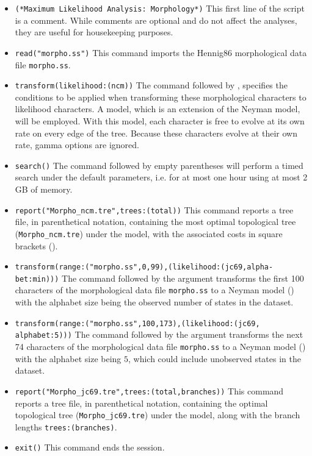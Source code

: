 \begin{itemize}
\item \texttt{(*Maximum Likelihood Analysis: Morphology*)} This
first line of the script is a comment.  While comments are optional
and do not affect the analyses, they are useful for housekeeping
purposes.  
\item \texttt{read("morpho.ss")} This command imports
the Hennig86 morphological data file \texttt{morpho.ss}.  
\item \texttt{transform(likelihood:(ncm))} The 
command followed by , specifies the
conditions to be applied when transforming these morphological
characters to likelihood characters. A  model,
which is an extension of the Neyman model, will be employed.  With
this model, each character is free to evolve at its own rate on
every edge of the tree. Because these characters evolve at their
own rate, gamma options are ignored.  
\item \texttt{search()} The  command followed 
by empty parentheses will perform a timed search under the default 
parameters, i.e. for at most one hour using at most 2 GB of memory.  
\item \texttt{report("Morpho\_ncm.tre",trees:(total))} This command reports
a tree file, in parenthetical notation,  containing the most optimal
topological tree (\texttt{Morpho\_ncm.tre}) under the 
model, with the associated costs in square brackets ().
\item \texttt{transform(range:("morpho.ss",0,99),(likelihood:(jc69,alpha-\\bet:min)))}
The  command followed by the 
argument transforms the first 100 characters of the morphological
data file \texttt{morpho.ss} to a Neyman model ()
with the alphabet size being the observed number of states in the
dataset. 
\item \texttt{transform(range:("morpho.ss",100,173),(likelihood:(jc69,\\alphabet:5)))}
The  command followed by the 
argument transforms the next 74 characters of the morphological
data file \texttt{morpho.ss} to a Neyman model ()
with the alphabet size being $5$, which could include unobserved
states in the dataset.  
\item \texttt{report("Morpho\_jc69.tre",trees:(total,branches))} This
command reports a tree file, in parenthetical notation, containing
the optimal topological tree (\texttt{Morpho\_jc69.tre}) under
the  model, along with the branch lengths
\texttt{trees:(branches)}. 
\item \texttt{exit()} This command ends the \poy session.
\end{itemize}

